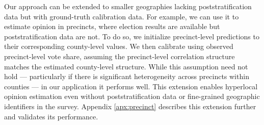 Our approach can be extended to smaller geographies  lacking poststratification data but with ground-truth calibration data. 
For example, we can use it to estimate opinion in precincts, where election results are available but poststratification data are not.
To do so, we initialize precinct-level predictions to their corresponding county-level values.
We then calibrate using observed precinct-level vote share, assuming the precinct-level correlation structure matches the estimated county-level structure.
While this assumption need not hold --- particularly if there is significant heterogeneity across precincts within counties --- in our application it performs well.
This extension enables hyperlocal opinion estimation even without poststratification data or fine-grained geographic identifiers in the survey.
Appendix \ref{apx:precinct} describes this extension further and validates its performance.
